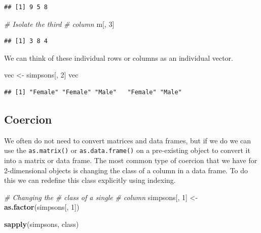 \documentclass[
]{book}
\newenvironment{Shaded}{\begin{snugshade}}{\end{snugshade}}
\newcommand{\CommentTok}[1]{\textcolor[rgb]{0.56,0.35,0.01}{\textit{#1}}}
\newcommand{\DecValTok}[1]{\textcolor[rgb]{0.00,0.00,0.81}{#1}}
\newcommand{\KeywordTok}[1]{\textcolor[rgb]{0.13,0.29,0.53}{\textbf{#1}}}
\newcommand{\NormalTok}[1]{#1}
\newcommand{\StringTok}[1]{\textcolor[rgb]{0.31,0.60,0.02}{#1}}
\begin{document}
\begin{verbatim}
## [1] 9 5 8
\end{verbatim}

\begin{Shaded}
\begin{Highlighting}[]
\CommentTok{# Isolate the third}
\CommentTok{# column}
\NormalTok{m[, }\DecValTok{3}\NormalTok{]}
\end{Highlighting}
\end{Shaded}

\begin{verbatim}
## [1] 3 8 4
\end{verbatim}

We can think of these individual rows or columns as an individual vector.

\begin{Shaded}
\begin{Highlighting}[]
\NormalTok{vec <-}\StringTok{ }\NormalTok{simpsons[, }\DecValTok{2}\NormalTok{]}
\NormalTok{vec}
\end{Highlighting}
\end{Shaded}

\begin{verbatim}
## [1] "Female" "Female" "Male"   "Female" "Male"
\end{verbatim}

\hypertarget{coercion-3}{%
\subsection{Coercion}\label{coercion-3}}

We often do not need to convert matrices and data frames, but if we do we can use the \texttt{as.matrix()} or \texttt{as.data.frame()} on a pre-existing object to convert it into a matrix or data frame. The most common type of coercion that we have for 2-dimensional objects is changing the class of a column in a data frame. To do this we can redefine this class explicitly using indexing.

\begin{Shaded}
\begin{Highlighting}[]
\CommentTok{# Changing the}
\CommentTok{# class of a single}
\CommentTok{# column}
\NormalTok{simpsons[, }\DecValTok{1}\NormalTok{] <-}\StringTok{ }\KeywordTok{as.factor}\NormalTok{(simpsons[,}
    \DecValTok{1}\NormalTok{])}

\KeywordTok{sapply}\NormalTok{(simpsons, class)}
\end{Highlighting}
\end{Shaded}
\end{document}
